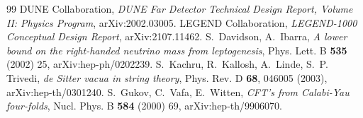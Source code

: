 \documentclass[12pt,a4paper]{article}
\numberwithin{equation}{section}
\begin{document}
\begin{thebibliography}{99}
 DUNE Collaboration, \emph{DUNE Far Detector Technical Design Report, Volume II: Physics Program}, arXiv:2002.03005.
 LEGEND Collaboration, \emph{LEGEND-1000 Conceptual Design Report}, arXiv:2107.11462.
 S.~Davidson, A.~Ibarra, \emph{A lower bound on the right-handed neutrino mass from leptogenesis}, Phys. Lett. B \textbf{535} (2002) 25, arXiv:hep-ph/0202239.
 S.~Kachru, R.~Kallosh, A.~Linde, S.~P. Trivedi, \emph{de Sitter vacua in string theory}, Phys. Rev. D \textbf{68}, 046005 (2003), arXiv:hep-th/0301240.
 S.~Gukov, C.~Vafa, E.~Witten, \emph{CFT's from Calabi-Yau four-folds}, Nucl. Phys. B \textbf{584} (2000) 69, arXiv:hep-th/9906070.
\end{thebibliography}
\end{document}
